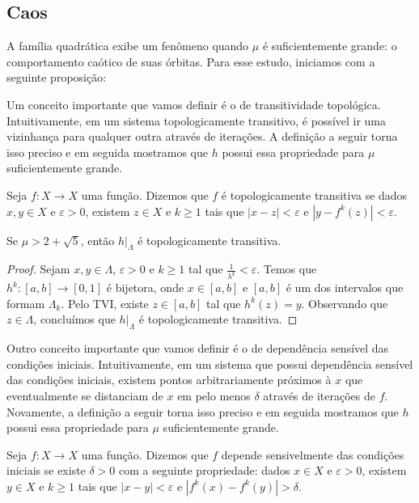 \subsection{Caos}

A família quadrática exibe um fenômeno quando $\mu$ é suficientemente grande: o comportamento caótico de suas órbitas.
Para esse estudo, iniciamos com a seguinte proposição:

Um conceito importante que vamos definir é o de transitividade topológica. Intuitivamente, em um sistema topologicamente transitivo, é possível ir uma vizinhança para qualquer outra através de iterações. A definição a seguir torna isso preciso e em seguida mostramos que $h$ possui essa propriedade para $\mu$ suficientemente grande.

\begin{definition}
Seja $f: X \to X$ uma função. Dizemos que $f$ é topologicamente transitiva se dados $x, y \in X$ e $\varepsilon > 0$,  existem $z \in X$ e $k \geq 1$ tais que $|x - z| < \varepsilon$ e $|y - f^k(z)| < \varepsilon$.
\end{definition} 

\begin{proposition}
Se $\mu > 2 + \sqrt{5}$, então $h|_\Lambda$ é topologicamente transitiva.
\end{proposition}

\begin{proof}
Sejam $x, y \in \Lambda$, $\varepsilon > 0$ e $k \geq 1$ tal que $\frac{1}{\lambda^k} < \varepsilon$.
Temos que $h^k: [a, b] \to [0, 1]$ é bijetora, onde $x \in [a, b]$ e $[a, b]$ é um dos intervalos que formam $\Lambda_k$. Pelo TVI, existe $z \in [a, b]$ tal que $h^k(z) = y$. Observando que $z \in \Lambda$, concluímos que $h|_\Lambda$ é topologicamente transitiva.
\end{proof}

Outro conceito importante que vamos definir é o de dependência sensível das condições iniciais. Intuitivamente, em um sistema que possui dependência sensível das condições iniciais, existem pontos arbitrariamente próximos à $x$ que eventualmente se distanciam de $x$ em pelo menos $\delta$ através de iterações de $f$. Novamente, a definição a seguir torna isso preciso e em seguida mostramos que $h$ possui essa propriedade para $\mu$ suficientemente grande.

\begin{definition}
Seja $f: X \to X$ uma função. Dizemos que $f$ depende sensivelmente das condições iniciais se existe $\delta > 0$ com a seguinte propriedade: dados $x \in X$ e $\varepsilon > 0$, existem $y \in X$ e $k \geq 1$ tais que $|x - y| < \varepsilon$ e $|f^k(x) - f^k(y)| > \delta$.
\end{definition}

